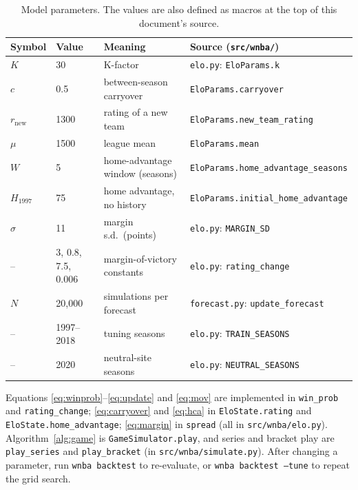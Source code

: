 \documentclass[11pt]{article}
\newcommand{\Kval}{30}             %
\newcommand{\carry}{0.5}           %
\newcommand{\rnew}{1300}           %
\newcommand{\rmean}{1500}          %
\newcommand{\Hwin}{5}              %
\newcommand{\Hinit}{75}            %
\newcommand{\sigmaval}{11}         %
\newcommand{\Nsims}{20{,}000}      %
\newcommand{\trainyears}{1997--2018}
\theoremstyle{plain}
\theoremstyle{definition}
\theoremstyle{remark}
\begin{document}
\begin{table}[h]
\centering
\small
\begin{tabular}{llll}
\toprule
Symbol & Value & Meaning & Source (\texttt{src/wnba/}) \\
\midrule
$K$ & \Kval & K-factor & \texttt{elo.py}: \texttt{EloParams.k} \\
$c$ & \carry & between-season carryover & \texttt{EloParams.carryover} \\
$r_{\mathrm{new}}$ & \rnew & rating of a new team & \texttt{EloParams.new\_team\_rating} \\
$\mu$ & \rmean & league mean & \texttt{EloParams.mean} \\
$W$ & \Hwin & home-advantage window (seasons) & \texttt{EloParams.home\_advantage\_seasons} \\
$H_{1997}$ & \Hinit & home advantage, no history & \texttt{EloParams.initial\_home\_advantage} \\
$\sigma$ & \sigmaval & margin s.d.\ (points) & \texttt{elo.py}: \texttt{MARGIN\_SD} \\
-- & 3, 0.8, 7.5, 0.006 & margin-of-victory constants & \texttt{elo.py}: \texttt{rating\_change} \\
$N$ & \Nsims & simulations per forecast & \texttt{forecast.py}: \texttt{update\_forecast} \\
-- & \trainyears & tuning seasons & \texttt{elo.py}: \texttt{TRAIN\_SEASONS} \\
-- & 2020 & neutral-site seasons & \texttt{elo.py}: \texttt{NEUTRAL\_SEASONS} \\
\bottomrule
\end{tabular}
\caption{Model parameters. The values are also defined as macros at the top of this document's source.}
\end{table}

Equations \eqref{eq:winprob}--\eqref{eq:update} and \eqref{eq:mov} are implemented in \texttt{win\_prob} and \texttt{rating\_change}; \eqref{eq:carryover} and \eqref{eq:hca} in \texttt{EloState.rating} and \texttt{EloState.home\_advantage}; \eqref{eq:margin} in \texttt{spread} (all in \texttt{src/wnba/elo.py}). Algorithm~\ref{alg:game} is \texttt{GameSimulator.play}, and series and bracket play are \texttt{play\_series} and \texttt{play\_bracket} (in \texttt{src/wnba/simulate.py}). After changing a parameter, run \texttt{wnba backtest} to re-evaluate, or \texttt{wnba backtest --tune} to repeat the grid search.

\end{document}
